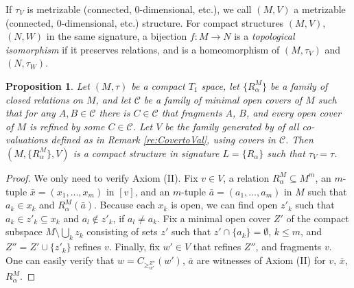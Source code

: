 \documentclass[12pt]{amsart}
\theoremstyle{plain}
\newtheorem{proposition}[theorem]{\bf Proposition}
\newcommand \NN{\mathbb{N}}
\newcommand \PPb{\mathbb{P}}
\begin{document}
If $\tau_V$ is metrizable (connected, $0$-dimensional, etc.), we call $(M,V)$ a metrizable (connected, $0$-dimensional, etc.) structure. For compact structures $(M,V)$, $(N,W)$ in the same signature, a bijection $f:M \to N$ is a \emph{topological isomorphism} if it preserves relations, and is a homeomorphism of $(M,\tau_V)$ and $(N,\tau_W)$.

	
\begin{proposition}
\label{pr:CompactAreStructures}
Let $(M,\tau)$ be a compact $T_1$ space, let $\{R^M_\alpha\}$ be a family of closed relations on $M$, and let $\mathcal{C}$ be a family of minimal open covers of $M$ such that for any $A,B \in \mathcal{C}$ there is $C \in \mathcal{C}$ that fragments $A$, $B$, and every open cover of $M$ is refined by some $C \in \mathcal{C}$. Let $V$ be the family generated by of all co-valuations defined as in Remark \ref{re:CovertoVal}, using covers in $\mathcal{C}$. Then $(M,\{R^M_\alpha\},V)$ is a compact structure in signature $L=\{R_\alpha\}$ such that $\tau_V=\tau$. %
\end{proposition}
	
\begin{proof}
 We only need to verify Axiom (II). Fix $v \in V$, a relation $R^M_\alpha \subseteq M^m$, an $m$-tuple $\bar{x}=(x_1, \ldots, x_m)$ in $[v]$, and an $m$-tuple $\bar{a}=(a_1, \ldots, a_m)$ in $M$ such that $a_k \in x_k$ and $R^M_\alpha(\bar{a})$. %
Because each $x_k$ is open, we can find open $z'_k$ such that $a_k \in z'_k \subseteq x_k$ and $a_l \not \in z'_k$, if $a_l \neq a_k$. Fix a minimal open cover $Z'$ of the compact subspace $M \setminus \bigcup_k z_k$ consisting of sets $z'$ such that $z' \cap \{a_k\} =\emptyset$, $k \leq m$, and $Z''=Z' \cup \{z'_k\}$ refines $v$. Finally, fix $w' \in V$ that refines $Z''$, and fragments $v$. %
One can easily verify that $w=C_{\geq^{Z''}_{w'}}(w')$, $\bar{a}$ are witnesses of Axiom (II) for $v$, $\bar{x}$, $R^M_\alpha$.
\end{proof}
\end{document}
